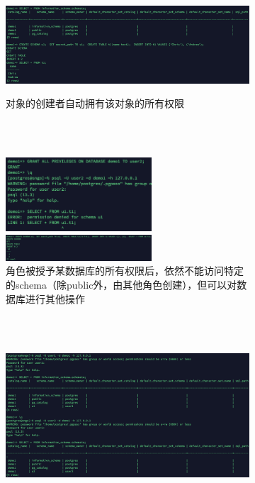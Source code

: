 \begin{figure}
	\centering
	\begin{subfigure}[b]{0.8\textwidth}
		\centerline{\includegraphics[height=3.6cm]{./pic/ins.png}}
		\caption{对象的创建者自动拥有该对象的所有权限}
	\end{subfigure}
	\\~\\
	\begin{subfigure}[b]{0.8\textwidth}
		\centerline{\includegraphics[width=0.6\textwidth]{./pic/grdb_nsch.png}}
		\centerline{\includegraphics[width=0.6\textwidth]{./pic/u2.png}}
		\caption{角色被授予某数据库的所有权限后，依然不能访问特定的schema（除public外，由其他角色创建），但可以对数据库进行其他操作}
	\end{subfigure}
	\\~\\
	\begin{subfigure}[b]{0.8\textwidth}
		\centerline{\includegraphics[width=\textwidth]{./pic/nvsb.png}}

\end{subfigure}
\end{figure}
